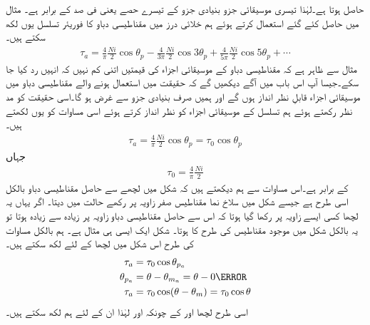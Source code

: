حاصل ہوتا ہے۔لہٰذا تیسری موسیقائی جزو بنیادی جزو کے تیسرے حصے یعنی  فی صد کے برابر ہے۔
%
مثال  میں حاصل کئے گئے  استعمال کرتے ہوئے  ہم خلائی درز میں مقناطیسی دباو  کا فوریئر تسلسل یوں لکھ سکتے ہیں۔
\begin{align}\label{مساوات_تبادلہ_توانائی_فوریئر_متقناطیسی_دباو_تسلسل}
\tau_a=\frac{4}{\pi}\frac{Ni}{2} \cos \theta_p-\frac{4}{3\pi}\frac{Ni}{2} \cos 3\theta_p+\frac{4}{5\pi}\frac{Ni}{2} \cos 5\theta_p+\cdots
\end{align}
مثال  سے ظاہر ہے کہ مقناطیسی دباو کے موسیقائی اجزاء  کی قیمتیں اتنی کم نہیں کہ انہیں رد کیا جا سکے۔جیسا آپ اس باب میں آگے دیکھیں گے کہ حقیقت میں استعمال ہونے والے  مقناطیسی دباو میں موسیقائی اجزاء قابلِ نظر انداز ہوں گے اور ہمیں صرف بنیادی جزو  سے غرض ہو گا۔اسی حقیقت کو مد نظر رکھتے ہوئے ہم  تسلسل کے موسیقائی اجزاء کو نظر انداز کرتے ہوئے اسی مساوات کو یوں لکھتے ہیں۔ 
\begin{align}
\tau_{a}=\frac{4}{\pi}\frac{Ni}{2} \cos \theta_p=\tau_0 \cos \theta_p
\end{align}
جہاں
\begin{align}\label{مساوات_گھومتے_مشین_دباو_چوٹی}
\tau_0=\frac{4}{\pi}\frac{Ni}{2} 
\end{align}
کے برابر ہے۔اس مساوات سے ہم دیکھتے ہیں کہ شکل   میں لچھے سے حاصل مقناطیسی دباو بالکل اسی طرح ہے جیسے شکل   میں سلاخ نما مقناطیس صفر زاویہ پر رکھے حالت میں دیتا۔ اگر یہاں یہ لچھا کسی ایسے زاویہ پر رکھا گیا ہوتا کہ اس سے حاصل مقناطیسی دباو زاویہ   پر زیادہ سے زیادہ ہوتا تو یہ بالکل شکل   میں موجود مقناطیس کی طرح کا ہوتا۔ شکل   ایک ایسی ہی مثال ہے۔ ہم بالکل مساوات    کی طرح اس شکل میں لچھا   کے لئے لکھ سکتے ہیں۔
\begin{gather}
\begin{aligned}\label{مساوات_گھومتے_مشین_الف_موج}
\tau_a&=\tau_0 \cos \theta_{p_a}\\
\theta_{p_a}&=\theta-\theta_{m_a}=\theta-0\degree\\
\tau_a&=\tau_0 \cos (\theta-\theta_m)=\tau_0 \cos \theta
\end{aligned}
\end{gather}
اسی طرح لچھا  اور  کے  چونکہ  اور   لہٰذا ان کے لئے ہم لکھ سکتے ہیں۔
